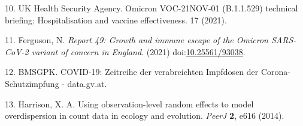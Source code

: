\documentclass[
]{article}
\begin{document}
\leavevmode\hypertarget{ref-ukhealthsecurityagencyOmicronVOC21NOV015292021}{}%
10. UK Health Security Agency. Omicron VOC-21NOV-01 (B.1.1.529) technical briefing: Hospitalisation and vaccine effectiveness. 17 (2021).

\leavevmode\hypertarget{ref-fergusonReport49Growth2021}{}%
11. Ferguson, N. \emph{Report 49: Growth and immune escape of the Omicron SARS-CoV-2 variant of concern in England}. (2021) doi:\href{https://doi.org/10.25561/93038}{10.25561/93038}.

\leavevmode\hypertarget{ref-bmsgpkCOVID19ZeitreiheVerabreichten}{}%
12. BMSGPK. COVID-19: Zeitreihe der verabreichten Impfdosen der Corona-Schutzimpfung - data.gv.at.

\leavevmode\hypertarget{ref-harrisonUsingObservationlevelRandom2014}{}%
13. Harrison, X. A. Using observation-level random effects to model overdispersion in count data in ecology and evolution. \emph{PeerJ} \textbf{2}, e616 (2014).
\end{document}
